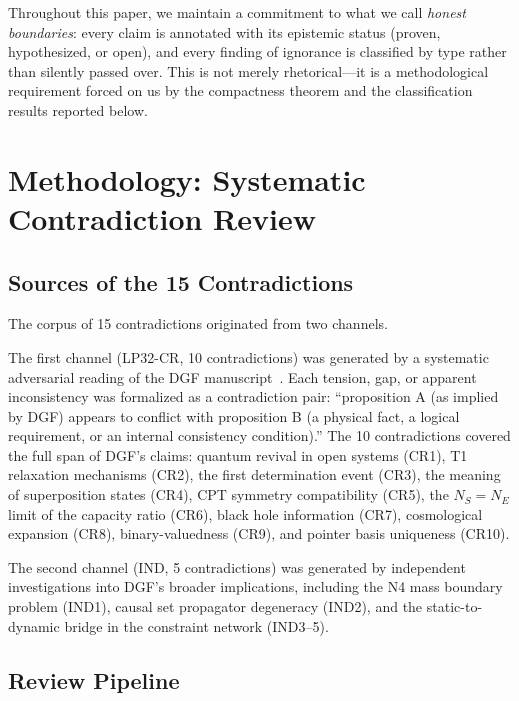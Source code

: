 \documentclass[12pt,a4paper]{article}
\theoremstyle{definition}
\theoremstyle{remark}
\begin{document}
Throughout this paper, we maintain a commitment to what we call \emph{honest boundaries}: every claim is annotated with its epistemic status (proven, hypothesized, or open), and every finding of ignorance is classified by type rather than silently passed over. This is not merely rhetorical---it is a methodological requirement forced on us by the compactness theorem and the classification results reported below.

\section{Methodology: Systematic Contradiction Review}
\label{sec:method}

\subsection{Sources of the 15 Contradictions}

The corpus of 15 contradictions originated from two channels.

The first channel (LP32-CR, 10 contradictions) was generated by a systematic adversarial reading of the DGF manuscript~\cite{DGF2026}. Each tension, gap, or apparent inconsistency was formalized as a contradiction pair: ``proposition A (as implied by DGF) appears to conflict with proposition B (a physical fact, a logical requirement, or an internal consistency condition).'' The 10 contradictions covered the full span of DGF's claims: quantum revival in open systems (CR1), T1 relaxation mechanisms (CR2), the first determination event (CR3), the meaning of superposition states (CR4), CPT symmetry compatibility (CR5), the $N_S=N_E$ limit of the capacity ratio (CR6), black hole information (CR7), cosmological expansion (CR8), binary-valuedness (CR9), and pointer basis uniqueness (CR10).

The second channel (IND, 5 contradictions) was generated by independent investigations into DGF's broader implications, including the N4 mass boundary problem (IND1), causal set propagator degeneracy (IND2), and the static-to-dynamic bridge in the constraint network (IND3--5).

\subsection{Review Pipeline}
\end{document}
